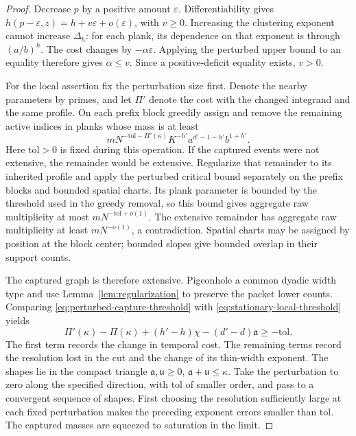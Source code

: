 \begin{proof}
Decrease $p$ by a positive amount $\varepsilon$. Differentiability gives
$h(p-\varepsilon,z)=h+v\varepsilon+o(\varepsilon)$, with $v\ge0$.
Increasing the clustering exponent cannot increase $\Delta_h$: for each
plank, its dependence on that exponent is through $(a/b)^h$. The cost
changes by $-\alpha\varepsilon$. Applying the perturbed upper bound to an
equality therefore gives $\alpha\le v$. Since a positive-deficit equality
exists, $v>0$.

For the local assertion fix the perturbation size first. Denote the
nearby parameters by primes, and let $\Pi'$ denote the cost with the
changed integrand and the same profile. On each prefix block greedily
assign and remove the remaining active indices in planks whose mass is
at least
\begin{equation}
 mN^{-\mathrm{tol}-\Pi'(\kappa)}K^{-h'}
       a^{d'-1-h'}b^{1+h'}.
 \label{eq:perturbed-capture-threshold}
\end{equation}
Here $\mathrm{tol}>0$ is fixed during this operation. If the captured
events were not extensive, the remainder would be extensive. Regularize
that remainder to its inherited profile and apply the perturbed critical
bound separately on the prefix blocks and bounded spatial charts. Its
plank parameter is bounded by the threshold used in the greedy removal,
so this bound gives aggregate raw multiplicity at most
$mN^{-\mathrm{tol}+o(1)}$. The extensive remainder has aggregate raw
multiplicity at least $mN^{-o(1)}$, a contradiction. Spatial charts may be
assigned by position at the block center; bounded slopes give bounded
overlap in their support counts.

The captured graph is therefore extensive. Pigeonhole a common dyadic
width type and use Lemma~\ref{lem:regularization} to preserve the packet
lower counts. Comparing \eqref{eq:perturbed-capture-threshold} with
\eqref{eq:stationary-local-threshold} yields
\begin{equation}
 \Pi'(\kappa)-\Pi(\kappa)
 +(h'-h)\chi-(d'-d)\mathfrak a\ge-\mathrm{tol}.
 \label{eq:finite-parameter-capture}
\end{equation}
The first term records the change in temporal cost. The remaining terms
record the resolution lost in the cut and the change of its thin-width
exponent. The shapes lie in the compact triangle
$\mathfrak a,\mathfrak u\ge0$, $\mathfrak a+\mathfrak u\le\kappa$.
Take the perturbation to zero along the specified direction, with
$\mathrm{tol}$ of smaller order, and pass to a convergent sequence of
shapes. First choosing the resolution sufficiently large at each fixed
perturbation makes the preceding exponent errors smaller than
$\mathrm{tol}$. The captured masses are squeezed to saturation in the
limit.


\end{proof}

